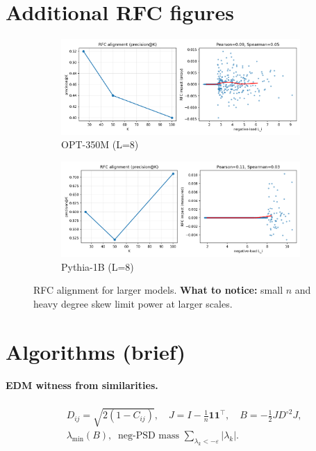 \documentclass[11pt]{article}
\newcommand{\1}{\mathbf{1}}
\begin{document}
\appendix
\FloatBarrier
\clearpage
\section{Additional RFC figures}
\label{app:rfc-big}
\begin{figure}[h!]
\centering
\begin{subfigure}[t]{0.48\textwidth}
\includegraphics[width=\linewidth]{figs/rfc_alignment_facebook_opt-350m_residual_L8}
\caption{OPT-350M (L=8)}
\end{subfigure}\hfill
\begin{subfigure}[t]{0.48\textwidth}
\includegraphics[width=\linewidth]{figs/rfc_alignment_EleutherAI_pythia-1b_residual_L8.png}
\caption{Pythia-1B (L=8)}
\end{subfigure}
\caption{RFC alignment for larger models. \textbf{What to notice:} small $n$ and heavy degree skew limit power at larger scales.}
\label{fig:rfc_alignment_panel_big}
\end{figure}

\FloatBarrier
\section{Algorithms (brief)}
\paragraph{EDM witness from similarities.}
\begin{align*}
& D_{ij}=\sqrt{2(1-C_{ij})},\quad J=I-\tfrac1n \1\1^\top,\quad B=-\tfrac12 J D^{\circ2} J,\\
& \lambda_{\min}(B),\;\; \text{neg-PSD mass } \sum_{\lambda_k<-\varepsilon}|\lambda_k|.
\end{align*}
\end{document}

